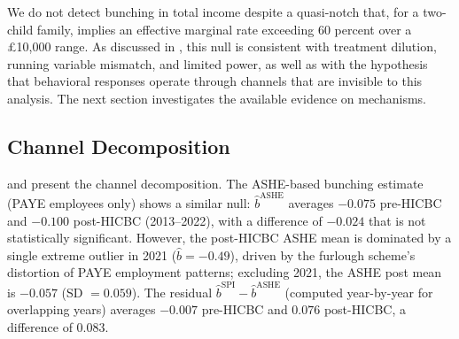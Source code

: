 \documentclass[12pt]{article}
\newcommand{\bhat}{\hat{b}}
\begin{document}
We do not detect bunching in total income despite a quasi-notch that, for a two-child family, implies an effective marginal rate exceeding 60 percent over a \pounds10,000 range. As discussed in , this null is consistent with treatment dilution, running variable mismatch, and limited power, as well as with the hypothesis that behavioral responses operate through channels that are invisible to this analysis. The next section investigates the available evidence on mechanisms.

\subsection{Channel Decomposition}

 and  present the channel decomposition. The ASHE-based bunching estimate (PAYE employees only) shows a similar null: $\bhat^{\text{ASHE}}$ averages $-0.075$ pre-HICBC and $-0.100$ post-HICBC (2013--2022), with a difference of $-0.024$ that is not statistically significant. However, the post-HICBC ASHE mean is dominated by a single extreme outlier in 2021 ($\bhat = -0.49$), driven by the furlough scheme's distortion of PAYE employment patterns; excluding 2021, the ASHE post mean is $-0.057$ (SD $= 0.059$). The residual $\bhat^{\text{SPI}} - \bhat^{\text{ASHE}}$ (computed year-by-year for overlapping years) averages $-0.007$ pre-HICBC and $0.076$ post-HICBC, a difference of 0.083.
\end{document}
